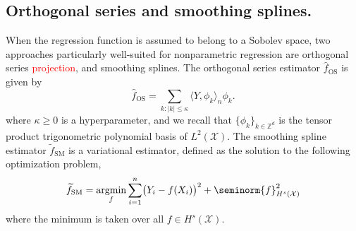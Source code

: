 \documentclass{article}
\newcommand{\abs}[1]{\left \lvert #1 \right \rvert}
\newcommand{\1}{\mathbf{1}}
\DeclareMathOperator*{\argmin}{argmin}
\newcommand{\Xset}{\mathcal{X}}
\newcommand{\Leb}{L}
\newcommand{\dotp}[2]{\langle #1, #2 \rangle}
\newcommand{\wt}[1]{\widetilde{#1}}
\newcommand{\wh}[1]{\widehat{#1}}
\newcommand{\SM}{\mathrm{SM}}
\newcommand{\OS}{\mathrm{OS}}
\theoremstyle{alden}
\theoremstyle{aldenthm}
\theoremstyle{definition}
\theoremstyle{remark}
\begin{document}
\subsection{Orthogonal series and smoothing splines.}
\label{subsec:continuum_methods}
When the regression function is assumed to belong to a Sobolev space, two approaches particularly well-suited for nonparametric regression are orthogonal series \textcolor{red}{projection}, and smoothing splines. The orthogonal series estimator $\wh{f}_{\OS}$ is given by
\begin{equation}
\label{eqn:orthogonal_series}
\wh{f}_{\OS} = \sum_{k: \abs{k} \leq \kappa} \dotp{Y}{\phi_k}_n \phi_k .
\end{equation}
where $\kappa \geq 0$ is a hyperparameter, and we recall that $\{\phi_k\}_{k \in \mathbb{Z}^d}$ is the tensor product trigonometric polynomial basis of $\Leb^2(\Xset)$. The smoothing spline estimator $\wt{f}_{\SM}$ is a variational estimator, defined as the solution to the following optimization problem,
\begin{equation}
\label{eqn:smoothing_spline}
\wt{f}_{\SM} = \argmin_{f} \sum_{i = 1}^{n} \bigl(Y_i - f(X_i)\bigr)^2 + \seminorm{f}_{H^{s}(\Xset)}^2
\end{equation}
where the minimum is taken over all $f \in H^s(\Xset)$.
\end{document}

